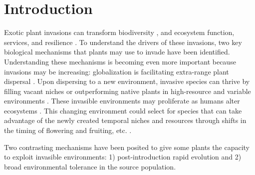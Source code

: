 \documentclass[12pt]{article}\usepackage[]{graphicx}\usepackage[]{color}
\begin{document}
	\section{Introduction} %
	Exotic plant invasions  can transform biodiversity \parencite{Bellard2016,Clavero2005,Walker1997}, and ecosystem function, services, and resilience \parencite{Daehler1999,Daehler1994,Ehrenfeld2003,Wilcove1998,Pejchar2009,Pimentel2005,Pysek2010,OTA1993,Mack2000,Levine2003}. To understand the drivers of these invasions, two key biological mechanisms that plants may use to invade have been identified. Understanding these mechanisms is becoming even more important because invasions may be increasing: globalization is facilitating extra-range plant dispersal \parencite{Helmus2014,McKinney1999,Pysek2002,Vitousek1996,Wittenberg2001}. Upon dispersing to a new environment, invasive species can thrive by filling vacant niches \parencite{Elton1958} or outperforming native plants in high-resource and variable environments \parencite{Davis2001,Daehler2003}. These invasible environments may proliferate as humans alter ecosystems \parencite{Tilman2001, Blois2013,Inouye2008,Harte2015}. This changing environment could select for species that can take advantage of the newly created temporal niches and resources through shifts in the timing of flowering and fruiting, etc. \parencite{Franks2007}. 
	
	Two contrasting mechanisms have been posited to give some plants the capacity to exploit invasible environments: 1) post-introduction rapid evolution and 2) broad environmental tolerance in the source population. 
\end{document}
